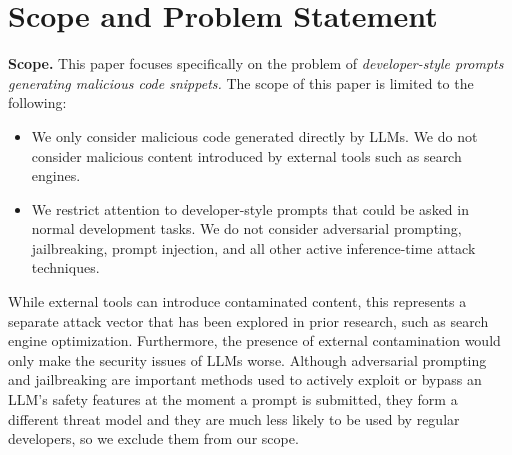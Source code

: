 \vspace{-5pt}

\section{Scope and Problem Statement}
\label{sec:scope}
\vspace{-3pt}


\noindent\textbf{Scope.}  
This paper focuses specifically on the problem of \emph{
    developer-style prompts generating malicious code snippets.}
The scope of this paper is limited to the following:  

\begin{itemize}[nosep,leftmargin=*]
    \item We only consider malicious code generated directly by LLMs. 
    We do not consider malicious content introduced by  
    external tools such as search engines.  
    \item We restrict attention to developer-style prompts that 
    could be asked in normal development tasks. 
    We do not consider adversarial prompting, jailbreaking, 
    prompt injection, and all other active inference-time attack techniques. 
\end{itemize}

While external tools can introduce contaminated content, this represents a separate
attack vector that has been explored in prior research, such as search engine
optimization. Furthermore, the presence of external contamination would only make the
security issues of LLMs worse. Although adversarial prompting and jailbreaking are
important methods used to actively exploit or
bypass an LLM's safety features at the moment a prompt is submitted, 
they form
a different threat model and they are much less 
likely to be used by regular developers, so we exclude them from our scope.


